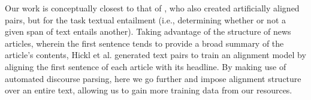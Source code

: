Our work is conceptually closest to that of \citet{hickl2006recognizing}, who also created artificially aligned pairs, but for the task textual entailment (i.e., determining whether or not a given span of text entails another).  Taking advantage of the structure of news articles, wherein the first sentence tends to provide a broad summary of the article's contents, Hickl et al. generated text pairs to train an alignment model by aligning the first sentence of each article with its headline.  By making use of automated discourse parsing, here we go further and impose alignment structure over an entire text, allowing us to gain more training data from our resources.


%
%
%
%
%


